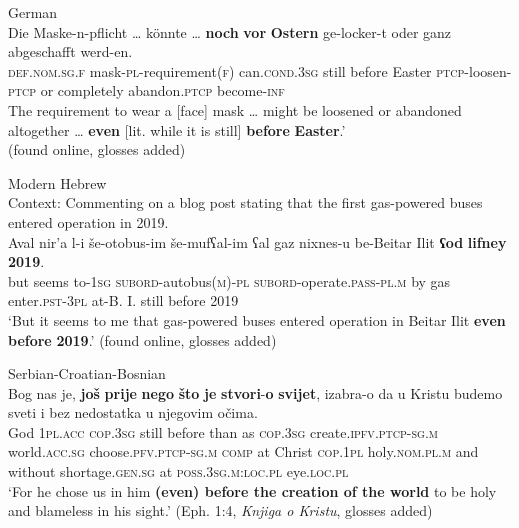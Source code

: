 \begin{exe}
	\ex German\label{exTimeScalarGermanPrecedence}\\
\gll Die Maske-n-pflicht … könnte … \textbf{noch} \textbf{vor} \textbf{Ostern} ge-locker-t oder ganz abgeschafft werd-en.\\
\textsc{def}.\textsc{nom}.\textsc{sg}.\textsc{f} mask-\textsc{pl}-requirement(\textsc{f}) {} can.\textsc{cond}.3\textsc{sg} {} still before Easter \textsc{ptcp}-loosen-\textsc{ptcp} or completely abandon.\textsc{ptcp} become-\textsc{inf}\\
\glt The requirement to wear a [face] mask … might be loosened or abandoned altogether … \textbf{even} [lit. while it is still] \textbf{before} \textbf{Easter}.'\\(found online, glosses added)%

	\ex Modern Hebrew\label{exTimeScalarHebrewEvenBefore}\\
	Context: Commenting on a blog post stating that the first gas-powered buses entered operation in 2019.\\
	\gll Aval nir’a l-i še-otobus-im še-mufʕal-im ʕal gaz nixnes-u be-{Beitar Ilit} \textbf{ʕod} \textbf{lifney} \textbf{2019}.\\
	but seems to-1\textsc{sg} \textsc{subord}-autobus(\textsc{m})-\textsc{pl} \textsc{subord}-operate.\textsc{pass}-\textsc{pl}.\textsc{m} by gas enter.\textsc{pst}-3\textsc{pl} at-{B. I.} still before 2019\\
	\glt \lq But it seems to me that gas-powered buses entered operation in Beitar Ilit \textbf{even} \textbf{before} \textbf{2019}.\rq{ }(found online, glosses added)%
		
	\ex Serbian-Croatian-Bosnian\label{exTimeScalarSerbianEvenBefore}\\
	\gll Bog nas je, \textbf{još} \textbf{prije} \textbf{nego} \textbf{što} \textbf{je} \textbf{stvori}-\textbf{o} \textbf{svijet}, izabra-o da u Kristu budemo sveti i bez nedostatka u njegovim očima.\\
God 1\textsc{pl}.\textsc{acc} \textsc{cop}.3\textsc{sg} still before than as \textsc{cop}.3\textsc{sg} create.\textsc{ipfv}.\textsc{ptcp}-\textsc{sg}.\textsc{m} world.\textsc{acc}.\textsc{sg} choose.\textsc{pfv}.\textsc{ptcp}-\textsc{sg}.\textsc{m} \textsc{comp} at Christ \textsc{cop}.1\textsc{pl} holy.\textsc{nom}.\textsc{pl}.\textsc{m} and without shortage.\textsc{gen}.\textsc{sg} at \textsc{poss}.3\textsc{sg}.\textsc{m}:\textsc{loc}.\textsc{pl} eye.\textsc{loc}.\textsc{pl}\\
	\glt \lq For he chose us in him \textbf{(even) before the creation of the world} to be holy and blameless in his sight.\rq{ }(Eph. 1:4, \textit{Knjiga o Kristu},  glosses added)	
\end{exe}

